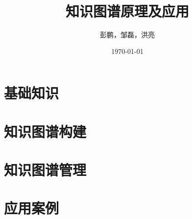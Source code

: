 \documentclass[UTF8]{book}
\begin{document}
\title{\huge 知识图谱原理及应用}

\author{彭鹏，邹磊，洪亮}

\date{\today}

\maketitle

\newpage

\tableofcontents

\newpage

\part{基础知识}






\part{知识图谱构建}
%
%


\part{知识图谱管理}




%

%
%
%

\part{应用案例}







\printbibliography
\end{document}
